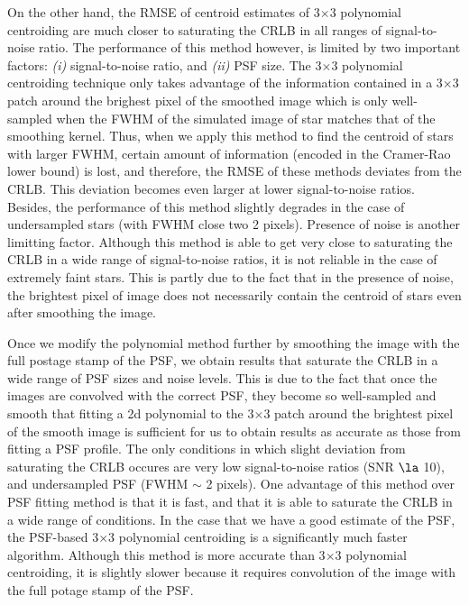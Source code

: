 \documentclass[12pt, preprint]{aastex}
\begin{document}
On the other hand, the RMSE of centroid estimates of 
3$\times$3 polynomial centroiding are much closer to saturating the CRLB in all ranges of signal-to-noise ratio.
The performance of this method however, is limited by
two important factors: \emph{(i)} signal-to-noise ratio, and \emph{(ii)} PSF size.
The 3$\times$3 polynomial centroiding technique only takes advantage of the information
 contained in a 3$\times$3 patch around the brighest pixel of the smoothed image which is only
 well-sampled when the FWHM of the simulated image of star
 matches that of the smoothing kernel. Thus, when we apply 
this method to find the centroid of stars with larger FWHM, certain amount of
information (encoded in the Cramer-Rao lower bound) is lost, and therefore, the RMSE
of these methods deviates from the CRLB. This deviation becomes even larger at lower
signal-to-noise ratios. Besides, the performance of this method slightly degrades
in the case of undersampled stars (with FWHM close two 2 pixels). 
Presence of noise is another limitting factor.
Although this method is able to get very close to saturating the CRLB in a wide range of
signal-to-noise ratios, it is not reliable in the case of extremely faint stars.
 This is partly due to the fact that in the presence of noise, 
the brightest pixel of image does not necessarily contain the centroid of stars even after smoothing 
the image.

Once we modify the polynomial method further by smoothing the image with the full postage stamp
of the PSF, we obtain results that saturate the CRLB in a wide range of PSF sizes and noise levels.  
This is due to the fact that once the images are convolved with the correct PSF, they become so well-sampled and smooth
that fitting a 2d polynomial to the 3$\times$3 patch around the brightest pixel of the smooth image is sufficient for us to obtain
results as accurate as those from fitting a PSF profile. The only conditions in which slight deviation from
saturating the CRLB occures are very low signal-to-noise ratios (SNR $\la$ 10), and undersampled PSF (FWHM $\sim$ 2 pixels).
One advantage of this method over PSF fitting method is that it is fast, and that it is able to saturate the CRLB in 
a wide range of conditions. In the case that we have a good estimate of the PSF, the 
PSF-based 3$\times$3 polynomial centroiding is a significantly much faster algorithm. 
Although this method is more accurate than 3$\times$3 polynomial centroiding, it is
slightly slower because it requires convolution of the image with the full potage stamp of the PSF. 
\end{document}
